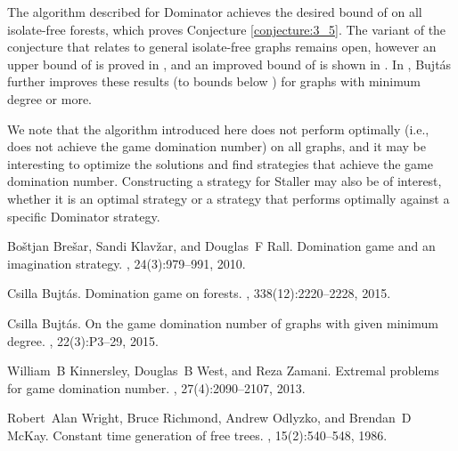 \documentclass[11pt]{article}
\theoremstyle{definition}
\begin{document}
The algorithm described for Dominator achieves the desired bound of  on all isolate-free forests, which proves Conjecture \ref{conjecture:3_5}.
The variant of the conjecture that relates to general isolate-free graphs remains open, however an upper bound of  is proved in \cite{kinnersley2013extremal}, and an improved bound of  is shown in \cite{bujtas2015game}. 
In \cite{bujtas2015game}, Bujt\'as further improves these results (to bounds below ) for graphs with minimum degree  or more.

We note that the algorithm introduced here does not perform optimally (i.e., does not achieve the game domination number) on all graphs, 
and it may be interesting to optimize the solutions and find strategies that achieve the game domination number.
Constructing a strategy for Staller may also be of interest, whether it is an optimal strategy or a strategy that performs optimally against a specific Dominator strategy.





\begin{thebibliography}{1}

Bo{\v{s}}tjan Bre{\v{s}}ar, Sandi Klav{\v{z}}ar, and Douglas~F Rall.
\newblock Domination game and an imagination strategy.
, 24(3):979--991, 2010.

Csilla Bujt{\'a}s.
\newblock Domination game on forests.
, 338(12):2220--2228, 2015.

Csilla Bujt{\'a}s.
\newblock On the game domination number of graphs with given minimum degree.
, 22(3):P3--29, 2015.

William~B Kinnersley, Douglas~B West, and Reza Zamani.
\newblock Extremal problems for game domination number.
, 27(4):2090--2107, 2013.

Robert~Alan Wright, Bruce Richmond, Andrew Odlyzko, and Brendan~D McKay.
\newblock Constant time generation of free trees.
, 15(2):540--548, 1986.

\end{thebibliography}
\end{document}
